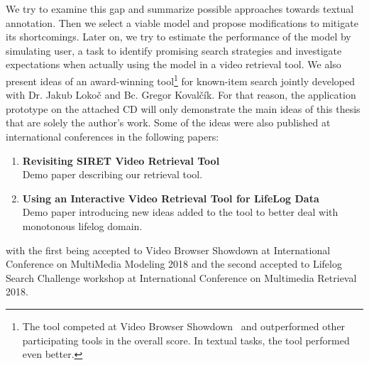 We try to examine this gap and summarize possible approaches towards textual annotation. Then we select a viable model and propose modifications to mitigate its shortcomings. Later on, we try to estimate the performance of the model by simulating user, a task to identify promising search strategies and investigate expectations when actually using the model in a video retrieval tool. We also present ideas of an award-winning tool\footnote{The tool competed at Video Browser Showdown~\cite{cobarzan2017interactive} and outperformed other participating tools in the overall score. In textual tasks, the tool performed even better.} for known-item search jointly developed with Dr. Jakub Lokoč and Bc. Gregor Kovalčík. For that reason, the application prototype on the attached CD will only demonstrate the main ideas of this thesis that are solely the author's work. Some of the ideas were also published at international conferences in the following papers:
\begin{enumerate}
	\item \textbf{Revisiting SIRET Video Retrieval Tool}~\cite{lokovc2018revisiting}\\
	Demo paper describing our retrieval tool.
	\item \textbf{Using an Interactive Video Retrieval Tool for LifeLog Data}~\cite{LokocLSC}\\
	Demo paper introducing new ideas added to the tool to better deal with monotonous lifelog domain.
\end{enumerate}
with the first being accepted to Video Browser Showdown at International Conference on MultiMedia Modeling 2018 and the second accepted to Lifelog Search Challenge workshop at International Conference on Multimedia Retrieval 2018.
